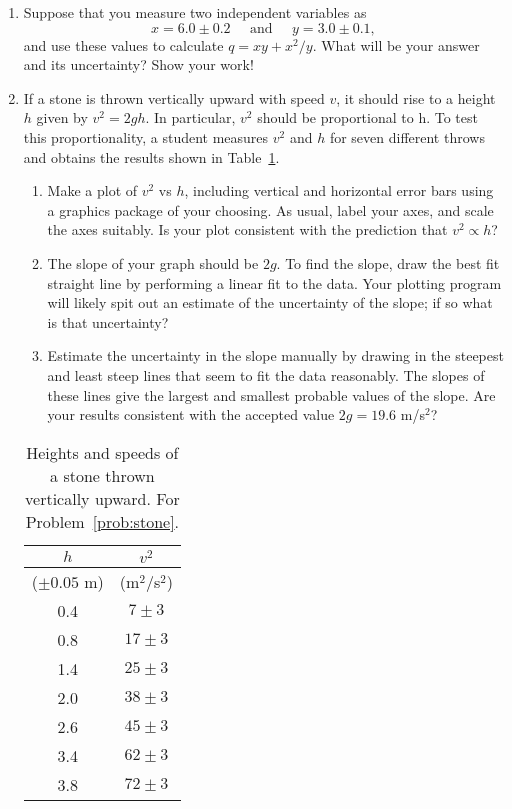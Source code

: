 \documentclass[aps,twocolumn,secnumarabic,balancelastpage,amsmath,amssymb,nofootinbib]{revtex4-1}
\begin{document}
\begin{enumerate}
\item Suppose that you measure two independent variables as
$$ x = 6.0 \pm 0.2 \;\;\;\;\; \mathrm{and} \;\;\;\;\; y = 3.0 \pm 0.1,$$
and use these values to calculate $q = xy + x^2/y$. What will be your answer and its uncertainty? Show your work!

\item \label{prob:stone} If a stone is thrown vertically upward with speed $v$, it should rise to a height $h$ given by $v^2 = 2gh$. In particular, $v^2$ should be proportional to h. To test this proportionality, a student measures $v^2$ and $h$ for seven different throws and obtains the results shown in Table~\ref{tab:stone}. 
	\begin{enumerate}
	\item Make a plot of $v^2$ vs $h$, including vertical and horizontal error bars using a graphics package of your choosing. As usual, label your axes, and scale the axes suitably. Is your plot consistent with the prediction that $v^2 \propto h$?
	\item The slope of your graph should be $2g$. To find the slope, draw the best fit straight line by performing a linear fit to the data. Your plotting program will likely spit out an estimate of the uncertainty of the slope; if so what is that uncertainty?
	\item Estimate the uncertainty in the slope manually by drawing in the steepest and least steep lines that seem to fit the data reasonably. The slopes of these lines give the largest and smallest probable values of the slope. Are your results consistent with the accepted value $2 g = 19.6$ m/s$^2$?
	\end{enumerate}

	\begin{table}[h]
	\caption{\label{tab:stone} Heights and speeds of a stone thrown vertically upward. For Problem~\ref{prob:stone}.}
	\begin{ruledtabular}
	\begin{tabular}{cc}
	 $h$ & $v^2$\\
	\hline
	($\pm 0.05$ m) & (m$^2$/s$^2$)\\
	\hline
	0.4 & $7 \pm 3$\\
	0.8 & $17 \pm 3$\\
	1.4 & $25 \pm 3$\\
	2.0 & $38\pm 3$\\
	2.6 & $45 \pm 3$\\
	3.4 & $62\pm 3$\\
	3.8 & $72\pm 3$\\
	
	\end{tabular}
	\end{ruledtabular}
	\end{table}







\end{enumerate}
\end{document}
